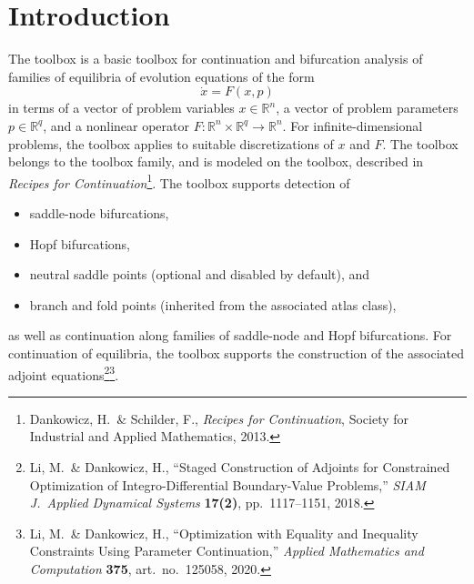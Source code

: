  

\section{Introduction}
\label{chap: ep}

The  toolbox is a basic toolbox for continuation and bifurcation analysis of families of equilibria of evolution equations of the form
\begin{equation}
\dot{x}=F(x,p)
\end{equation}
in terms of a vector of problem variables $x\in\mathbb{R}^n$, a vector of problem parameters $p\in\mathbb{R}^q$, and a nonlinear operator $F:\mathbb{R}^n\times\mathbb{R}^q\rightarrow\mathbb{R}^n$. For infinite-dimensional problems, the toolbox applies to suitable discretizations of $x$ and $F$. The  toolbox belongs to the  toolbox family, and is modeled on the  toolbox, described in \emph{Recipes for Continuation}\footnote{Dankowicz, H.~\& Schilder, F., \emph{Recipes for Continuation}, Society for Industrial and Applied Mathematics, 2013.}. The  toolbox supports detection of
\begin{itemize}
\item saddle-node bifurcations,
\item Hopf bifurcations,
\item neutral saddle points (optional and disabled by default), and
\item branch and fold points (inherited from the associated atlas class),
\end{itemize}
as well as continuation along families of saddle-node and Hopf bifurcations. For continuation of equilibria, the  toolbox supports the construction of the associated adjoint equations\footnote{Li, M.~\& Dankowicz, H., ``Staged Construction of Adjoints for Constrained Optimization of Integro-Differential Boundary-Value Problems,'' \emph{SIAM J.~Applied Dynamical Systems} \textbf{17(2)}, pp.~1117--1151, 2018.}\footnote{Li, M.~\& Dankowicz, H., ``Optimization with Equality and Inequality Constraints Using Parameter Continuation,'' \emph{Applied Mathematics and Computation} \textbf{375}, art.~no.~125058, 2020.}.

